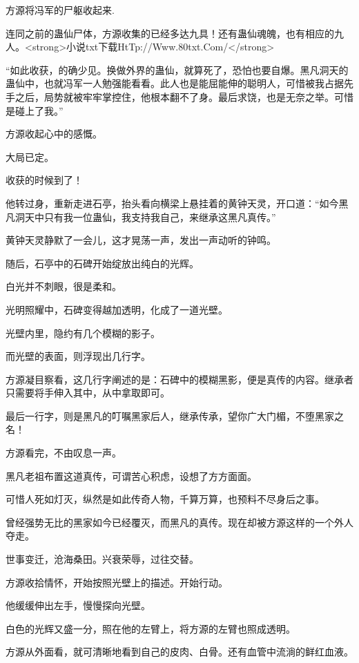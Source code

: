 
\begin{this_body}

方源将冯军的尸躯收起来.

连同之前的蛊仙尸体，方源收集的已经多达九具！还有蛊仙魂魄，也有相应的九人。<strong>小说txt下载HtTp://Www.80txt.Com/</strong>

“如此收获，的确少见。换做外界的蛊仙，就算死了，恐怕也要自爆。黑凡洞天的蛊仙中，也就冯军一人勉强能看看。此人也是能屈能伸的聪明人，可惜被我占据先手之后，局势就被牢牢掌控住，他根本翻不了身。最后求饶，也是无奈之举。可惜是碰上了我。”

方源收起心中的感慨。

大局已定。

收获的时候到了！

他转过身，重新走进石亭，抬头看向横梁上悬挂着的黄钟天灵，开口道：“如今黑凡洞天中只有我一位蛊仙，我支持我自己，来继承这黑凡真传。”

黄钟天灵静默了一会儿，这才晃荡一声，发出一声动听的钟鸣。

随后，石亭中的石碑开始绽放出纯白的光辉。

白光并不刺眼，很是柔和。

光明照耀中，石碑变得越加透明，化成了一道光壁。

光壁内里，隐约有几个模糊的影子。

而光壁的表面，则浮现出几行字。

方源凝目察看，这几行字阐述的是：石碑中的模糊黑影，便是真传的内容。继承者只需要将手伸入其中，从中拿取即可。

最后一行字，则是黑凡的叮嘱黑家后人，继承传承，望你广大门楣，不堕黑家之名！

方源看完，不由叹息一声。

黑凡老祖布置这道真传，可谓苦心积虑，设想了方方面面。

可惜人死如灯灭，纵然是如此传奇人物，千算万算，也预料不尽身后之事。

曾经强势无比的黑家如今已经覆灭，而黑凡的真传。现在却被方源这样的一个外人夺走。

世事变迁，沧海桑田。兴衰荣辱，过往交替。

方源收拾情怀，开始按照光壁上的描述。开始行动。

他缓缓伸出左手，慢慢探向光壁。

白色的光辉又盛一分，照在他的左臂上，将方源的左臂也照成透明。

方源从外面看，就可清晰地看到自己的皮肉、白骨。还有血管中流淌的鲜红血液。


\end{this_body}
